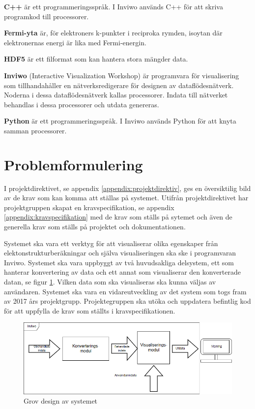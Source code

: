 \documentclass[a4paper,12pt]{article}
\begin{document}
\textbf{C++} är ett programmeringsspråk.
\cite{C++}
\newline
I Inviwo används C++ för att skriva programkod till
processorer.

\textbf{Fermi-yta} är, för elektroners k-punkter i reciproka rymden, isoytan där elektronernas energi är lika med Fermi-energin.
\cite{Fermi-yta}

\textbf{HDF5} är ett filformat som kan hantera stora mängder data.
\cite{hdf5}

\textbf{Inviwo} (Interactive Visualization Workshop) är programvara
för visualisering som tillhandahåller en nätverksredigerare för
designen av dataflödesnätverk. Noderna i dessa dataflödesnätverk
kallas processorer. Indata till nätverket behandlas i dessa
processorer och utdata genereras.
\cite{Inviwo}

\textbf{Python} är ett programmeringsspråk.
\cite{Python}
\newline
I Inviwo används Python för att knyta samman processorer.


\section{Problemformulering}
\label{ch:problemformulering}

I projektdirektivet, se appendix \ref{appendix:projektdirektiv}, ges en översiktilig bild av de krav som kan komma att ställas på systemet. Utifrån projektdirektivet har projektgruppen skapat en kravspecifikation, se appendix \ref{appendix:kravspecifikation} med de krav som ställs på sytemet och även de generella krav som ställs på projektet och dokumentationen.

Systemet ska vara ett verktyg för att visualiserar olika egenskaper från elektonstrukturberäkningar och  själva visualiseringen ska ske i programvaran Inviwo\cite{Inviwo}.
Systemet ska vara uppbyggt av två huvudsakliga delsystem, ett som hanterar konvertering av data och ett annat som visualiserar den konverterade datan, se figur \ref{fig:grov-skiss}. Vilken data som ska visualiseras ska kunna väljas av användaren. Systemet ska vara en vidareutveckling av det system som togs fram av 2017 års projektgrupp. Projektegruppen ska utöka och uppdatera befintlig kod för att uppfylla de krav som ställts i kravspecifikationen.

\begin{figure}[H]
	\centering
	\includegraphics[scale=0.55]{grov-skiss.png}
	\caption{Grov design av systemet}
	\label{fig:grov-skiss}
\end{figure}
\end{document}
